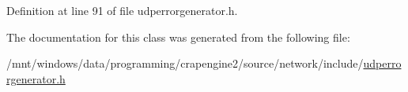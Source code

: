 Definition at line 91 of file udperrorgenerator.\+h.



The documentation for this class was generated from the following file\+:\begin{DoxyCompactItemize}
\item 
/mnt/windows/data/programming/crapengine2/source/network/include/\hyperlink{udperrorgenerator_8h}{udperrorgenerator.\+h}\end{DoxyCompactItemize}
